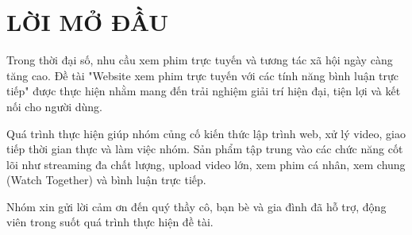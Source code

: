 
\newpage



\section*{LỜI MỞ ĐẦU}

Trong thời đại số, nhu cầu xem phim trực tuyến và tương tác xã hội ngày càng tăng cao. Đề tài "Website xem phim trực tuyến với các tính năng bình luận trực tiếp" được thực hiện nhằm mang đến trải nghiệm giải trí hiện đại, tiện lợi và kết nối cho người dùng.

Quá trình thực hiện giúp nhóm củng cố kiến thức lập trình web, xử lý video, giao tiếp thời gian thực và làm việc nhóm. Sản phẩm tập trung vào các chức năng cốt lõi như streaming đa chất lượng, upload video lớn, xem phim cá nhân, xem chung (Watch Together) và bình luận trực tiếp.

Nhóm xin gửi lời cảm ơn đến quý thầy cô, bạn bè và gia đình đã hỗ trợ, động viên trong suốt quá trình thực hiện đề tài.